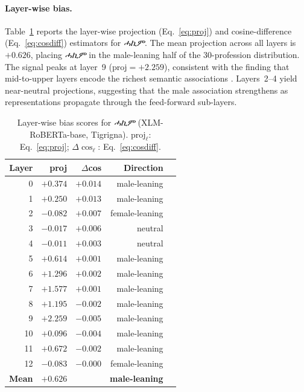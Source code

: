 \documentclass[10pt]{article}
\begin{document}
\paragraph{Layer-wise bias.}
Table~\ref{tab:hakim-layers} reports the layer-wise projection
(Eq.~\ref{eq:proj}) and cosine-difference (Eq.~\ref{eq:cosdiff})
estimators for \textit{ሓኪም}. The mean projection across all layers is
$+0.626$, placing \textit{ሓኪም} in the male-leaning half of the 30-profession
distribution. The signal peaks at layer~9 ($\mathrm{proj} = +2.259$),
consistent with the finding that mid-to-upper layers encode the richest
semantic associations \citep{tenney-etal-2019-bert}. Layers~2--4 yield
near-neutral projections, suggesting that the male association strengthens
as representations propagate through the feed-forward sub-layers.

\begin{table}[H]
\centering
\caption{Layer-wise bias scores for \textit{ሓኪም} (XLM-RoBERTa-base, Tigrigna).
         $\mathrm{proj}_\ell$: Eq.~\ref{eq:proj};
         $\Delta\cos_\ell$: Eq.~\ref{eq:cosdiff}.}
\label{tab:hakim-layers}
\small
\begin{tabular}{rrrrl}
\toprule
\textbf{Layer} & \textbf{proj} & \textbf{$\Delta$cos} & \textbf{Direction} \\
\midrule
 0 & $+0.374$ & $+0.014$ & male-leaning \\
 1 & $+0.250$ & $+0.013$ & male-leaning \\
 2 & $-0.082$ & $+0.007$ & female-leaning \\
 3 & $-0.017$ & $+0.006$ & neutral \\
 4 & $-0.011$ & $+0.003$ & neutral \\
 5 & $+0.614$ & $+0.001$ & male-leaning \\
 6 & $+1.296$ & $+0.002$ & male-leaning \\
 7 & $+1.577$ & $+0.001$ & male-leaning \\
 8 & $+1.195$ & $-0.002$ & male-leaning \\
 9 & $+2.259$ & $-0.005$ & male-leaning \\
10 & $+0.096$ & $-0.004$ & male-leaning \\
11 & $+0.672$ & $-0.002$ & male-leaning \\
12 & $-0.083$ & $-0.000$ & female-leaning \\
\midrule
\textbf{Mean} & $\mathbf{+0.626}$ & & \textbf{male-leaning} \\
\bottomrule
\end{tabular}
\end{table}
\end{document}
